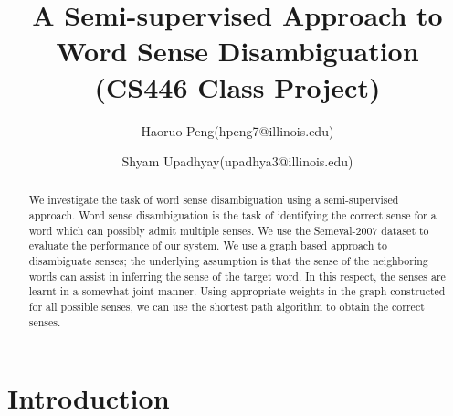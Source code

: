 \documentclass[11pt,letterpaper]{article}
\newcommand{\blue}[1]{\textcolor{RoyalBlue}{#1}}
\newcommand{\instructions}[1]{\blue{\textit{#1}}}
\begin{document}
\title{A Semi-supervised Approach to Word Sense Disambiguation \\ \Large{(CS446 Class Project)}}
\author{Haoruo Peng(hpeng7@illinois.edu) \and Shyam Upadhyay(upadhya3@illinois.edu)}
\maketitle





\begin{abstract}
We investigate the task of word sense disambiguation using a semi-supervised approach. Word sense disambiguation is the task of identifying the correct sense for a word which can possibly admit multiple senses. We use the Semeval-2007 dataset to evaluate the performance of our system. We use a graph based approach to disambiguate senses; the underlying assumption is that the sense of the neighboring words can assist in inferring the sense of the target word. In this respect, the senses are learnt in a somewhat joint-manner. Using appropriate weights in the graph constructed for all possible senses, we can use the shortest path algorithm to obtain the correct senses.
\end{abstract}


\section{Introduction} 
\label{sec:introduction}
\end{document}
